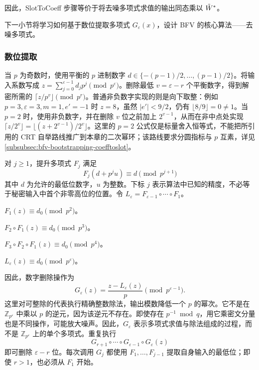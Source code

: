 因此，\textsf{SlotToCoeff} 步骤等价于将去噪多项式求值的输出同态乘以 $\tilde{W}^*$。

下一小节将学习如何基于数位提取多项式 $G_\varepsilon(x)$，设计 BFV 的核心算法——去噪多项式。


\subsubsection{数位提取}
\label{subsubsec:bfv-bootstrapping-digit-extraction}


当 $p$ 为奇数时，使用平衡的 $p$ 进制数字 $d\in\{-(p-1)/2,\ldots,(p-1)/2\}$。将输入系数写成 $z=\sum_{j=0}^{\varepsilon-1}d_jp^j\pmod{p^\varepsilon}$。删除最低 $v=\varepsilon-r$ 个平衡数字，得到解密所需的 $\lceil z/p^v\rfloor\pmod{p^r}$。普通非负数字实现的则是向下取整：例如 $p=3,\varepsilon=3,m=1,e'=-1$ 时 $z=8$，虽然 $|e'|<9/2$，仍有 $\lfloor8/9\rfloor=0\ne1$。当 $p=2$ 时，使用非负数字，并在删除 $v$ 位之前加上 $2^{v-1}$，从而在非中点处实现 $\lceil z/2^v\rfloor=\lfloor(z+2^{v-1})/2^v\rfloor$。这里的 $p=2$ 公式仅是标量舍入恒等式，不能把所引用的 CRT 自举路线推广到本章的二次幂环；该路线要求分圆指标与 $p$ 互素，详见 \autoref{subsubsec:bfv-bootstrapping-coefftoslot}。

对 $j\geq1$，提升多项式 $F_j$ 满足
\[
F_j(d+p^ju)\equiv d\pmod{p^{j+1}}
\]
其中 $d$ 为允许的最低位数字，$u$ 为整数。下标 $j$ 表示算法中已知的精度，不必等于秘密输入中首个非零高位的位置。令 $L_\varepsilon=F_{\varepsilon-1}\circ\cdots\circ F_1$。

$F_1(z)\equiv d_0\pmod{p^2}$。

$F_2\circ F_1(z)\equiv d_0\pmod{p^3}$。

$F_3\circ F_2\circ F_1(z)\equiv d_0\pmod{p^4}$。

$L_\varepsilon(z)\equiv d_0\pmod{p^\varepsilon}$。

因此，数字删除操作为
\[
G_\varepsilon(z)=\frac{z-L_\varepsilon(z)}p\pmod{p^{\varepsilon-1}}.
\]
这里对可整除的代表执行精确整数除法，输出模数降低一个 $p$ 的幂次。它不是在 $\mathbb Z_{p^\varepsilon}$ 中乘以 $p$ 的逆元，因为该逆元不存在。即使存在 $p^{-1}\bmod q$，用它乘密文分量也是不同操作，可能放大噪声。因此，$G_\varepsilon$ 表示多项式求值与除法组成的过程，而不是 $\mathbb Z_{p^\varepsilon}$ 上的单个多项式。重复执行
\[
G_{r+1}\circ\cdots\circ G_{\varepsilon-1}\circ G_\varepsilon(z)
\]
即可删除 $\varepsilon-r$ 位。每次调用 $G_j$ 都使用 $F_1,\ldots,F_{j-1}$ 提取自身输入的最低位；即使 $r>1$，也必须从 $F_1$ 开始。

